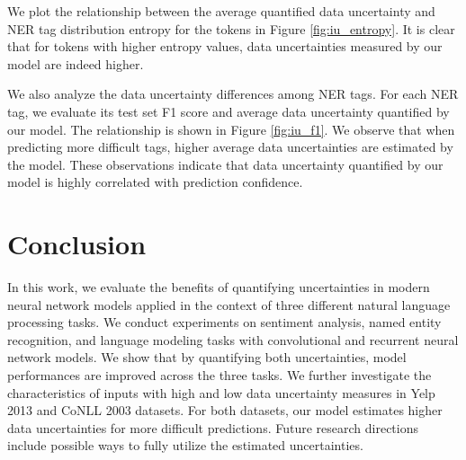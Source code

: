 \documentclass[letterpaper]{article} %
\begin{document}
We plot the relationship between the average quantified data uncertainty and NER tag distribution entropy for the tokens in Figure \ref{fig:iu_entropy}. It is clear that for tokens with higher entropy values, data uncertainties measured by our model are indeed higher.

We also analyze the data uncertainty differences among NER tags. For each NER tag, we evaluate its test set F1 score and average data uncertainty quantified by our model. The relationship is shown in Figure \ref{fig:iu_f1}. We observe that when predicting more difficult tags, higher average data uncertainties are estimated by the model. These observations indicate that data uncertainty quantified by our model is highly correlated with prediction confidence.

\section{Conclusion}
In this work, we evaluate the benefits of quantifying uncertainties in modern neural network models applied in the context of three different natural language processing tasks. We conduct experiments on sentiment analysis, named entity recognition, and language modeling tasks with convolutional and recurrent neural network models. We show that by quantifying both uncertainties, model performances are improved across the three tasks.
We further investigate the characteristics of inputs with high and low data uncertainty measures in Yelp 2013 and CoNLL 2003 datasets. For both datasets, our model estimates higher data uncertainties for more difficult predictions.
Future research directions include possible ways to fully utilize the estimated uncertainties. 


\end{document}
